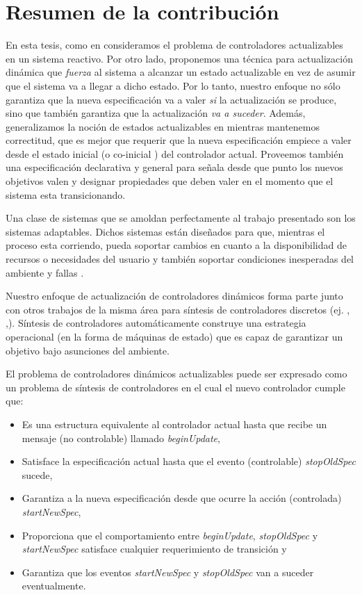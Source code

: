 \section{Resumen de la contribución}

En esta tesis, como en \cite{6224401,PanzicaLaManna:2013:FCC:2487336.2487349} consideramos el problema de controladores
actualizables en un sistema reactivo. Por otro lado, proponemos una técnica para actualización dinámica que
\emph{fuerza} al sistema a alcanzar un estado actualizable en vez de asumir que el sistema va a llegar a dicho estado.
Por lo tanto, nuestro enfoque no sólo garantiza que la nueva especificación va a valer \emph{si} la actualización se
produce, sino que también garantiza que la actualización \emph{va a suceder}. Además, generalizamos la noción de estados
actualizables en \cite{6224401,PanzicaLaManna:2013:FCC:2487336.2487349} mientras mantenemos correctitud, que es mejor que
requerir que la nueva especificación empiece a valer desde el estado inicial (o co-inicial 
\cite{PanzicaLaManna:2013:FCC:2487336.2487349}) del controlador actual. Proveemos también una especificación declarativa
y general para señala desde que punto los nuevos objetivos valen y designar propiedades que deben valer en el momento
que el sistema esta transicionando. 

Una clase de sistemas que se amoldan perfectamente al trabajo presentado son los sistemas adaptables. Dichos sistemas están diseñados
para que, mientras el proceso esta corriendo, pueda soportar cambios en cuanto a la disponibilidad de recursos o 
necesidades del usuario y también soportar condiciones inesperadas del ambiente y fallas \cite{SEAMS}. 

Nuestro enfoque de actualización de controladores dinámicos forma parte junto con otros trabajos de la misma área para
síntesis de controladores discretos (ej. \cite{21072}, \cite{Piterman},\cite{D'ippolito:2013:SNE:2430536.2430543}).
Síntesis de controladores automáticamente construye una estrategia operacional (en la forma de máquinas de estado) que
es capaz de garantizar un objetivo bajo asunciones del ambiente.

El problema de controladores dinámicos actualizables puede ser expresado como un problema de síntesis de controladores
en el cual el nuevo controlador cumple que:

\begin{itemize}
\itemsep-4mm
\item Es una estructura equivalente al controlador actual hasta que recibe un mensaje (no controlable) llamado
\emph{beginUpdate},
\item Satisface la especificación actual hasta que el evento (controlable) \emph{stopOldSpec} sucede,
\item Garantiza a la nueva especificación desde que ocurre la acción (controlada) \emph{startNewSpec},
\item Proporciona que el comportamiento entre \emph{beginUpdate}, \emph{stopOldSpec} y \emph{startNewSpec} satisface
cualquier requerimiento de transición y
\item Garantiza que los eventos \emph{startNewSpec} y \emph{stopOldSpec} van a suceder eventualmente.
\end{itemize}



